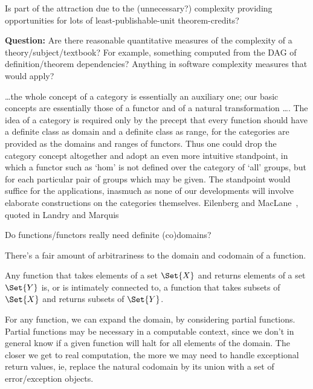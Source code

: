 \documentclass[11pt,openany]{book}
\begin{document}
Is part of the attraction due to the (unnecessary?)
complexity providing opportunities for lots of
least-publishable-unit 
theorem-credits?~\cite{jaffe_1993_theoretical,thurston_1994_proof}

\textbf{Question:} Are there reasonable quantitative measures
of the complexity of a theory/subject/textbook?
For example, something computed from the DAG of
definition/theorem dependencies?
Anything in software complexity measures that would apply?

\label{sec:arrow-more-general}

\begin{boxquote}
\ldots the whole concept of a category is essentially 
an auxiliary
one; our basic concepts are essentially those of a functor and of
a natural transformation {\ldots}. 
The idea of a category is required
only by the precept that every function should have a definite
class as domain and a definite class as range, for the categories
are provided as the domains and ranges of functors. Thus one
could drop the category concept altogether and adopt an even
more intuitive standpoint, in which a functor such as ‘hom’ is
not defined over the category of ‘all’ groups, 
but for each particular
pair of groups which may be given. The standpoint would
suffice for the applications, inasmuch as none of our developments
will involve elaborate constructions on the categories
themselves.
\tcblower
{Eilenberg and 
MacLane~\cite[p~247]{eilenberg_maclane_1945},
quoted in Landry and 
Marquis~\cite[p~3]{landry_marquis_2005_cat_th_in_context}}
\end{boxquote}

Do functions/functors really need definite (co)domains?

There's a fair amount of arbitrariness 
to the domain and codomain of a function.

Any function that takes elements of a set $\Set{X}$
and returns elements of a set $\Set{Y}$
is, or is intimately connected to, 
a function that takes subsets of $\Set{X}$ and returns
subsets of $\Set{Y}$.

For any function, we can expand the domain, by considering partial
functions. 
Partial functions may be necessary in a computable context,
since we don't in general know if a given function will
halt for all elements of the domain.
The closer we get to real computation, the more we may need to
handle exceptional return values, ie, replace the natural
codomain by its union with a set of error/exception objects.
\end{document}
